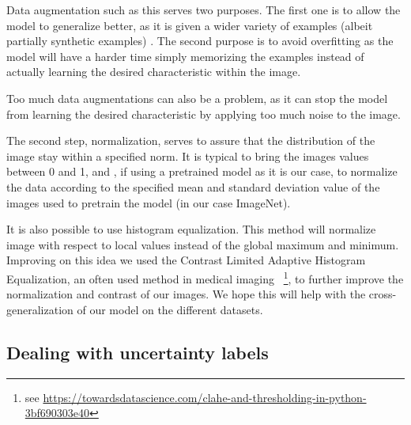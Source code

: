 \documentclass[11pt]{article}
\begin{document}
    Data augmentation such as this serves two purposes. The first one is to allow the model to generalize better, as it is given
    a wider variety of examples (albeit partially synthetic examples) . The second purpose is to avoid overfitting as the model will
    have a harder time simply memorizing the examples instead of actually learning the desired characteristic within the image.

    Too much data augmentations can also be a problem, as it can stop the model from learning the desired characteristic by applying too
    much noise to the image.

    The second step, normalization, serves to assure that the distribution of the image stay within a specified norm. It is typical
    to bring the images values between 0 and 1, and , if using a pretrained model as it is our case, to normalize the data
    according to the specified mean and standard deviation value of the images used to pretrain the model (in our case ImageNet).

    It is also possible to use histogram equalization. This method will normalize image with respect to local values instead of the global maximum and minimum.
    Improving on this idea we used the Contrast Limited Adaptive Histogram Equalization, an often used method in
    medical imaging~\cite{clahe}
    \footnote{see \url{https://towardsdatascience.com/clahe-and-thresholding-in-python-3bf690303e40}},
    to further improve the normalization and contrast of our images. We hope this will help with the
    cross-generalization of our model on the different datasets.


%
%




    \subsection{Dealing with uncertainty labels}
\end{document}
